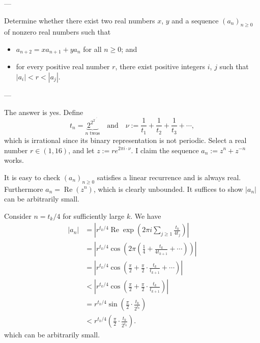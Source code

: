
---

Determine whether there exist two real numbers $x$, $y$ and a sequence $(a_n)_{n\ge0}$ of nonzero real numbers such that 
\begin{itemize}
    \item $a_{n+2}=xa_{n+1}+ya_n$ for all $n\ge0$; and
    \item for every positive real number $r$, there exist positive integers $i$, $j$ such that $|a_i|<r<|a_j|$.
\end{itemize}

---

The answer is yes. Define \[t_n=\underbrace{2^{2^{2^{\cdot^{\cdot^{\cdot^2}}}}}}_{n\text{ twos}}\quad\text{and}\quad\nu:=\frac1{t_1}+\frac1{t_2}+\frac1{t_3}+\cdots,\]
which is irrational since its binary representation is not periodic. Select a real number $r\in(1,16)$, and let $z:=re^{2\pi i\cdot\nu}$. I claim the sequence $a_n:=z^n+z^{-n}$ works.

It is easy to check $(a_n)_{n\ge0}$ satisfies a linear recurrence and is always real. Furthermore $a_n=\operatorname{Re}(z^n)$, which is clearly unbounded. It suffices to show $|a_n|$ can be arbitrarily small.

Consider $n=t_k/4$ for sufficiently large $k$. We have
\begin{align*}
    |a_n|&=\left\lvert r^{t_k/4}\operatorname{Re}\exp\left(2\pi i\sum_{j\ge1}\frac{t_k}{4t_j}\right)\right\rvert\\
    &=\left\lvert r^{t_k/4}\cos\left(2\pi\left(\frac14+\frac{t_k}{4t_{k+1}}+\cdots\right)\right)\right\rvert\\
    &=\left\lvert r^{t_k/4}\cos\left(\frac{\pi}2+\frac\pi2\cdot\frac{t_k}{t_{k+1}}+\cdots\right)\right\rvert\\
    &<\left\lvert r^{t_k/4}\cos\left(\frac{\pi}2+\frac\pi2\cdot\frac{t_k}{t_{k+1}}\right)\right\rvert\\
    &=r^{t_k/4}\sin\left(\frac\pi2\cdot\frac{t_k}{2^{t_k}}\right)\\
    &<r^{t_k/4}\left(\frac\pi2\cdot\frac{t_k}{2^{t_k}}\right).
\end{align*}
which can be arbitrarily small.

